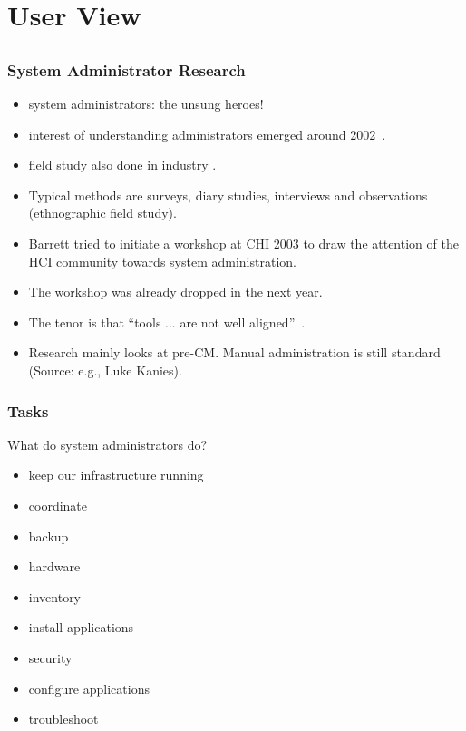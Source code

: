 \section{User View}
\subsection{}

\begin{frame}
	\frametitle{System Administrator Research}

	\begin{itemize}[<+-| alert@+>]
	\item system administrators: the unsung heroes!
	\item interest of understanding administrators emerged around 2002~\cite{anderson2002researching}.
	\item field study also done in industry \cite{barrett2004field}.
	\item Typical methods are surveys, diary studies, interviews and observations (ethnographic field study).
	\item Barrett \cite{barrett2003system} tried to initiate a workshop at CHI 2003 to draw the attention of the HCI community towards system administration.
	\item The workshop was already dropped in the next year.
	\item The tenor is that ``tools ... are not well aligned''~\cite{haber2007design}.
	\item Research mainly looks at pre-CM. Manual administration is still standard (Source: e.g., Luke Kanies).
	\end{itemize}
\end{frame}

\begin{frame}
	\frametitle{Tasks}

	What do system administrators do?

	\begin{itemize}[<+-| alert@+>]
	\item keep our infrastructure running
	\item coordinate
	\item backup
	\item hardware
	\item inventory
	\item install applications
	\item security
	\item configure applications
	\item troubleshoot
	\end{itemize}
\end{frame}


